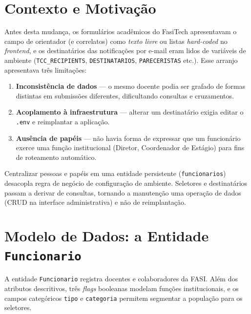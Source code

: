 \documentclass[12pt,a4paper]{report}
\begin{document}
\section{Contexto e Motivação}

Antes desta mudança, os formulários acadêmicos do FasiTech apresentavam o campo
de orientador (e correlatos) como \emph{texto livre} ou listas
\textit{hard-coded} no \textit{frontend}, e os destinatários das notificações
por e-mail eram lidos de variáveis de ambiente
(\texttt{TCC\_RECIPIENTS}, \texttt{DESTINATARIOS}, \texttt{PARECERISTAS} etc.).
Esse arranjo apresentava três limitações:

\begin{enumerate}
  \item \textbf{Inconsistência de dados} — o mesmo docente podia ser grafado de
        formas distintas em submissões diferentes, dificultando consultas e
        cruzamentos.
  \item \textbf{Acoplamento à infraestrutura} — alterar um destinatário exigia
        editar o \texttt{.env} e reimplantar a aplicação.
  \item \textbf{Ausência de papéis} — não havia forma de expressar que um
        funcionário exerce uma função institucional (Diretor, Coordenador de
        Estágio) para fins de roteamento automático.
\end{enumerate}

\begin{insight}[title=Banco de dados como fonte única de verdade]
Centralizar pessoas e papéis em uma entidade persistente (\texttt{funcionarios})
desacopla regra de negócio de configuração de ambiente. Seletores e
destinatários passam a derivar de consultas, tornando a manutenção uma operação
de dados (CRUD na interface administrativa) e não de reimplantação.
\end{insight}

\section{Modelo de Dados: a Entidade \texttt{Funcionario}}

A entidade \texttt{Funcionario} registra docentes e colaboradores da FASI. Além
dos atributos descritivos, três \emph{flags} booleanas modelam funções
institucionais, e os campos categóricos \texttt{tipo} e \texttt{categoria}
permitem segmentar a população para os seletores.
\end{document}
